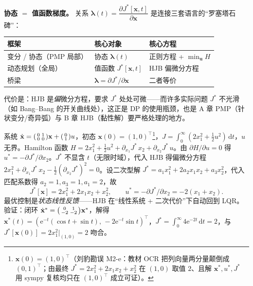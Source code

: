 \begin{insight}
\textbf{协态 $=$ 值函数梯度。}\; 关系 $\boldsymbol\lambda(t)=\dfrac{\partial J^*[\mathbf x,t]}{\partial\mathbf x}$ 是连接三套语言的“罗塞塔石碑”：
\begin{center}
\small
\begin{tabular}{lll}
\toprule
框架 & 核心对象 & 核心方程 \\
\midrule
变分 / 协态（PMP 局部）& 协态 $\boldsymbol\lambda(t)$ & 正则方程 + $\min_{\mathbf u}H$ \\
动态规划（全局）& 值函数 $J^*[\mathbf x,t]$ & HJB 偏微分方程 \\
桥梁 & $\boldsymbol\lambda=\partial J^*/\partial\mathbf x$ & 二者等价 \\
\bottomrule
\end{tabular}
\end{center}
代价是：HJB 是\emph{偏}微分方程，要求 $J^*$ 处处可微——而许多实际问题 $J^*$ 不光滑（如 Bang--Bang 的开关曲线处），这正是 DP 的使用瓶颈，也是 A 章 PMP（针状变分/奇异弧）与 B 章 HJB（黏性解）要严格处理的地方。
\end{insight}

\begin{example}\label{ex:oc-hjb-example}
系统 $\dot{\mathbf x}=\begin{psmallmatrix}0&1\\0&0\end{psmallmatrix}\mathbf x+\begin{psmallmatrix}0\\1\end{psmallmatrix}u$，初态 $\mathbf x(0)=(1,0)^\top$\footnote{$\mathbf x(0)=(1,0)^\top$（刘豹勘误 M2-e：教材 OCR 把列向量两分量颠倒成 $(0,1)^\top$；由最终 $J^*=2x_1^2+2x_1x_2+x_2^2$ 在 $(1,0)$ 取值 $2$、且解 $\mathbf x^*,u^*,J^*$ 用 sympy 复核均只在 $(1,0)^\top$ 成立可证）。}，$J=\int_0^\infty(2x_1^2+\tfrac12u^2)\,\mathrm dt$，$u$ 无界。Hamilton 函数 $H=2x_1^2+\tfrac12u^2+\partial_{x_1}J^*\,x_2+\partial_{x_2}J^*\,u$。由 $\partial H/\partial u=0$ 得 $u^*=-\partial J^*/\partial x_2$。$J^*$ 不显含 $t$（无限时域），代入 HJB 得偏微分方程 $2x_1^2+\partial_{x_1}J^*\,x_2-\tfrac12(\partial_{x_2}J^*)^2=0$。设二次型解 $J^*=a_1x_1^2+2a_2x_1x_2+a_3x_2^2$，代入匹配系数得 $a_2=1,a_3=1,a_1=2$，故
\begin{equation}
  J^*[\mathbf x]=2x_1^2+2x_1x_2+x_2^2,\qquad u^*=-\partial J^*/\partial x_2=-2(x_1+x_2).
  \label{eq:oc-hjb-feedback}
\end{equation}
最优控制是\emph{状态线性反馈}——HJB 在“线性系统 + 二次代价”下自动回到 LQR。验证：闭环 $\dot{\mathbf x}^*=\begin{psmallmatrix}0&1\\-2&-2\end{psmallmatrix}\mathbf x^*$，解得 $\mathbf x^*(t)=(\mathrm e^{-t}(\cos t+\sin t),\,-2\mathrm e^{-t}\sin t)^\top$，$J^*=\int_0^\infty4\mathrm e^{-2t}\,\mathrm dt=2$，与 $J^*[\mathbf x(0)]=2x_1^2|_{(1,0)}=2$ 吻合。
\end{example}

